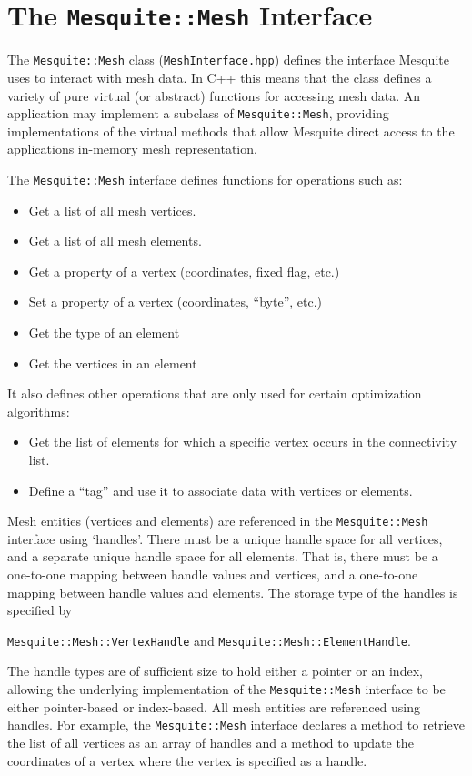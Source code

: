 \section{The \texttt{Mesquite::Mesh} Interface} \label{sec:MeshData}

The \texttt{Mesquite::Mesh} class (\texttt{MeshInterface.hpp}) defines the interface Mesquite uses to interact with mesh data.  In C++ this means that the class defines a variety of pure virtual (or abstract) functions for accessing mesh data.  An application may implement a subclass of \texttt{Mesquite::Mesh}, providing implementations of the virtual methods that allow Mesquite direct access to the applications in-memory mesh representation.  

The \texttt{Mesquite::Mesh} interface defines functions for operations such as:
\begin{itemize}
\item Get a list of all mesh vertices.
\item Get a list of all mesh elements.
\item Get a property of a vertex (coordinates, fixed flag, etc.)
\item Set a property of a vertex (coordinates, ``byte'', etc.)
\item Get the type of an element
\item Get the vertices in an element
\end{itemize}
It also defines other operations that are only used for certain optimization algorithms:
\begin{itemize}
\item Get the list of elements for which a specific vertex occurs in the connectivity list.
\item Define a ``tag'' and use it to associate data with vertices or elements.
\end{itemize}

Mesh entities (vertices and elements) are referenced in the \texttt{Mesquite::Mesh} interface using `handles'.  There must be a unique handle
space for all vertices, and a separate unique handle space for all elements. 
That is, there must be a one-to-one mapping between handle values and vertices,
and a one-to-one mapping between handle values and elements.  The storage type of
the handles is specified by 
\begin{center}
\texttt{Mesquite::Mesh::VertexHandle} and \texttt{Mesquite::Mesh::ElementHandle}.
\end{center}
The handle types are of sufficient size
to hold either a pointer or an index, allowing the underlying implementation of
the \texttt{Mesquite::Mesh} interface to be either pointer-based or index-based. 
All mesh entities are referenced using handles.  For example, the
\texttt{Mesquite::Mesh} interface declares a method to retrieve the list of all
vertices as an array of handles and a method to update the coordinates of a
vertex where the vertex is specified as a handle.

